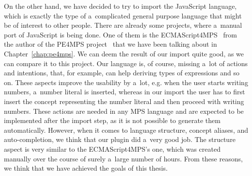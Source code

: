 On the other hand, we have decided to try to import the JavaScript language, which is exactly the type of a~complicated general purpose language that might be of interest to other people.
There are already some projects, where a~manual port of JavaScript is being done.
One of them is the ECMAScript4MPS~\cite{ECMAScript4MPS} from the author of the PE4MPS project~\cite{PE4MPS} that we have been talking about in Chapter~\ref{chap:pe4mps}.
We can deem the result of our import quite good, as we can compare it to this project.
Our language is, of course, missing a~lot of actions and intentions, that, for example, can help deriving types of expressions and so on.
These aspects improve the usability by a~lot, e.g. when the user starts writing numbers, a~number literal is inserted, whereas in our import the user has to first insert the concept representing the number literal and then proceed with writing numbers.
These actions are needed in any MPS language and are expected to be implemented after the import step, as it is not possible to generate them automatically.
However, when it comes to language structure, concept aliases, and auto-completion, we think that our plugin did a~very good job.
The structure aspect is very similar to the ECMAScript4MPS's one, which was created manually over the course of surely a~large number of hours.
From these reasons, we think that we have achieved the goals of this thesis.
